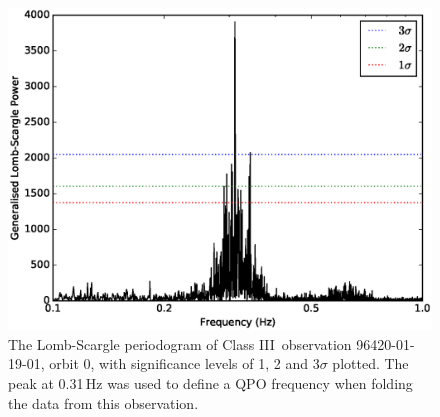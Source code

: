 \begin{figure}
    \includegraphics[width=\columnwidth, trim = 0mm 0mm 0mm 0mm]{images/LSVIII.eps}
    \captionsetup{singlelinecheck=off}
    \caption[The Lomb-Scargle periodogram of Class III observation 96420-01-19-01]{The Lomb-Scargle periodogram of Class III\indexiii\ observation 96420-01-19-01, orbit 0, with significance levels of 1, 2 and 3$\sigma$ plotted.  The peak at 0.31\,Hz was used to define a QPO frequency when folding the data from this observation.}
   \label{fig:IIILS}
\end{figure}

